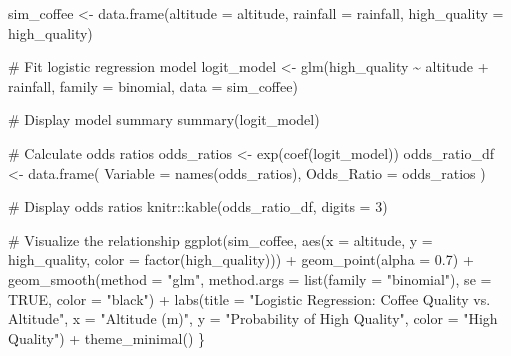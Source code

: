 \documentclass[
  letterpaper,
]{book}
\newenvironment{Shaded}{\begin{snugshade}}{\end{snugshade}}
\newcommand{\AttributeTok}[1]{\textcolor[rgb]{0.40,0.45,0.13}{#1}}
\newcommand{\CommentTok}[1]{\textcolor[rgb]{0.37,0.37,0.37}{#1}}
\newcommand{\ConstantTok}[1]{\textcolor[rgb]{0.56,0.35,0.01}{#1}}
\newcommand{\DecValTok}[1]{\textcolor[rgb]{0.68,0.00,0.00}{#1}}
\newcommand{\FloatTok}[1]{\textcolor[rgb]{0.68,0.00,0.00}{#1}}
\newcommand{\FunctionTok}[1]{\textcolor[rgb]{0.28,0.35,0.67}{#1}}
\newcommand{\NormalTok}[1]{\textcolor[rgb]{0.00,0.23,0.31}{#1}}
\newcommand{\OtherTok}[1]{\textcolor[rgb]{0.00,0.23,0.31}{#1}}
\newcommand{\SpecialCharTok}[1]{\textcolor[rgb]{0.37,0.37,0.37}{#1}}
\newcommand{\StringTok}[1]{\textcolor[rgb]{0.13,0.47,0.30}{#1}}
\begin{document}
\begin{Shaded}
\begin{Highlighting}[]
\NormalTok{  sim\_coffee }\OtherTok{\textless{}{-}} \FunctionTok{data.frame}\NormalTok{(}\AttributeTok{altitude =}\NormalTok{ altitude, }\AttributeTok{rainfall =}\NormalTok{ rainfall, }\AttributeTok{high\_quality =}\NormalTok{ high\_quality)}
  
  \CommentTok{\# Fit logistic regression model}
\NormalTok{  logit\_model }\OtherTok{\textless{}{-}} \FunctionTok{glm}\NormalTok{(high\_quality }\SpecialCharTok{\textasciitilde{}}\NormalTok{ altitude }\SpecialCharTok{+}\NormalTok{ rainfall, }\AttributeTok{family =}\NormalTok{ binomial, }\AttributeTok{data =}\NormalTok{ sim\_coffee)}
  
  \CommentTok{\# Display model summary}
  \FunctionTok{summary}\NormalTok{(logit\_model)}
  
  \CommentTok{\# Calculate odds ratios}
\NormalTok{  odds\_ratios }\OtherTok{\textless{}{-}} \FunctionTok{exp}\NormalTok{(}\FunctionTok{coef}\NormalTok{(logit\_model))}
\NormalTok{  odds\_ratio\_df }\OtherTok{\textless{}{-}} \FunctionTok{data.frame}\NormalTok{(}
    \AttributeTok{Variable =} \FunctionTok{names}\NormalTok{(odds\_ratios),}
    \AttributeTok{Odds\_Ratio =}\NormalTok{ odds\_ratios}
\NormalTok{  )}
  
  \CommentTok{\# Display odds ratios}
\NormalTok{  knitr}\SpecialCharTok{::}\FunctionTok{kable}\NormalTok{(odds\_ratio\_df, }\AttributeTok{digits =} \DecValTok{3}\NormalTok{)}
  
  \CommentTok{\# Visualize the relationship}
  \FunctionTok{ggplot}\NormalTok{(sim\_coffee, }\FunctionTok{aes}\NormalTok{(}\AttributeTok{x =}\NormalTok{ altitude, }\AttributeTok{y =}\NormalTok{ high\_quality, }\AttributeTok{color =} \FunctionTok{factor}\NormalTok{(high\_quality))) }\SpecialCharTok{+}
    \FunctionTok{geom\_point}\NormalTok{(}\AttributeTok{alpha =} \FloatTok{0.7}\NormalTok{) }\SpecialCharTok{+}
    \FunctionTok{geom\_smooth}\NormalTok{(}\AttributeTok{method =} \StringTok{"glm"}\NormalTok{, }\AttributeTok{method.args =} \FunctionTok{list}\NormalTok{(}\AttributeTok{family =} \StringTok{"binomial"}\NormalTok{), }\AttributeTok{se =} \ConstantTok{TRUE}\NormalTok{, }\AttributeTok{color =} \StringTok{"black"}\NormalTok{) }\SpecialCharTok{+}
    \FunctionTok{labs}\NormalTok{(}\AttributeTok{title =} \StringTok{"Logistic Regression: Coffee Quality vs. Altitude"}\NormalTok{,}
         \AttributeTok{x =} \StringTok{"Altitude (m)"}\NormalTok{,}
         \AttributeTok{y =} \StringTok{"Probability of High Quality"}\NormalTok{,}
         \AttributeTok{color =} \StringTok{"High Quality"}\NormalTok{) }\SpecialCharTok{+}
    \FunctionTok{theme\_minimal}\NormalTok{()}
\NormalTok{\}}
\end{Highlighting}
\end{Shaded}
\end{document}
